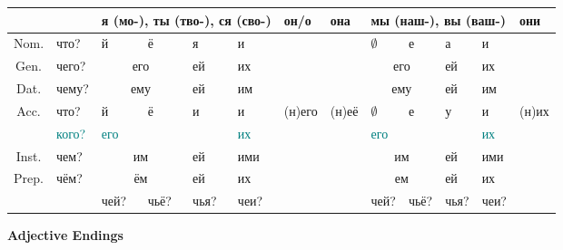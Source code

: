 \documentclass[a4paper, landscape, 11pt]{article}
\newcommand{\an}[1]{\textcolor{teal}{#1}} %
\begin{document}
\begin{tabularx}{\textwidth}{|c|X|X|X|X|X|X|X|X|X|X|X|X|}
	\hline
	\strut & \strut     & \multicolumn{4}{l|}{я (мо-), ты (тво-), ся (сво-)} & он/о   & она    & \multicolumn{4}{l|}{мы (наш-), вы (ваш-)}   & они    \\ \hline
	  Nom.    & что?       & й        & ё             & я      & и              & \strut & \strut & $\emptyset$ & е          & а      & и       & \strut \\ %
	  Gen.    & чего?      & \multicolumn{2}{c|}{его} & ей     & их             & \strut & \strut & \multicolumn{2}{c|}{его} & ей     & их      & \strut \\ %
	  Dat.    & чему?      & \multicolumn{2}{c|}{ему} & ей     & им             & \strut & \strut & \multicolumn{2}{c|}{ему} & ей     & им      & \strut \\ %
	  Acc.    & что?       & й        & ё             & и      & и              & (н)его & (н)её  & $\emptyset$ & е          & у      & и       & (н)их  \\
	\strut & \an{кого?} & \an{его} & \strut        & \strut & \an{их}        & \strut & \strut & \an{его}    & \strut     & \strut & \an{их} & \strut \\ %
	  Inst.    & чем?       & \multicolumn{2}{c|}{им}  & ей     & ими            & \strut & \strut & \multicolumn{2}{c|}{им}  & ей     & ими     & \strut \\ %
	  Prep.    & чём?       & \multicolumn{2}{c|}{ём}  & ей     & их             & \strut & \strut & \multicolumn{2}{c|}{ем}  & ей     & их      & \strut \\ \hline
	\strut & \strut     & чей?     & чьё?          & чья?   & чеи?           & \strut & \strut & чей?        & чьё?       & чья?   & чеи?    & \strut \\ \hline
\end{tabularx}

\vfill\strut

\newpage

\begin{center}
	\Huge\bfseries Adjective Endings
\end{center}
\end{document}
